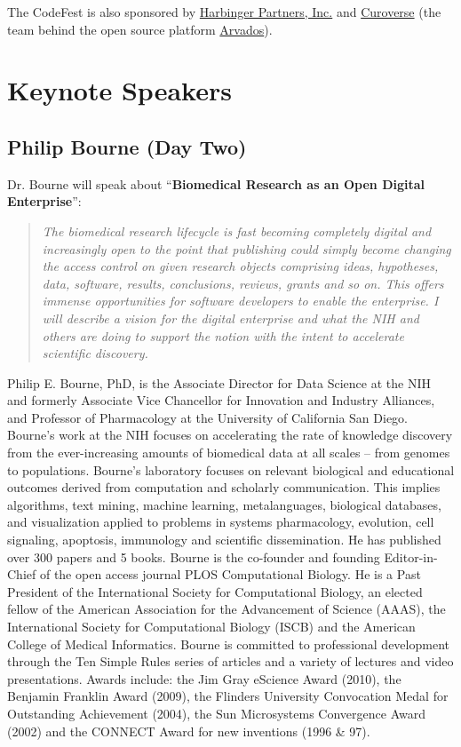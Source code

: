 \documentclass[12pt,oneside]{article}
\newcommand{\session}[3]{\clearpage\lhead{BOSC 2014 -- \textit{#1}\\#2\\#3}\newpage}
\begin{document}
\noindent
The CodeFest is also sponsored by \href{http://harbinger-partners.com/}{Harbinger Partners, Inc.}
and \href{https://curoverse.com/}{Curoverse} (the team behind the open source platform
\href{http://arvados.org/}{Arvados}).

\session{Keynote Speakers}{Days One \& Two, 9 \& 10 July 2014}{}
\section*{Keynote Speakers}

\subsection*{Philip Bourne (Day Two)}
\noindent
Dr. Bourne will speak about ``\textbf{Biomedical Research as an Open Digital Enterprise}'':
\begin{quote}
\small
\textit{The biomedical research lifecycle is fast becoming completely digital
and increasingly open to the point that publishing could simply become changing
the access control on given research objects comprising ideas, hypotheses, data,
software, results, conclusions, reviews, grants and so on. This offers immense
opportunities for software developers to enable the enterprise. I will describe
a vision for the digital enterprise and what the NIH and others are doing to
support the notion with the intent to accelerate scientific discovery.}
\end{quote}
Philip E. Bourne, PhD, is the Associate Director for Data Science at the NIH
and formerly Associate Vice Chancellor for Innovation and Industry Alliances,
and Professor of Pharmacology at the University of California San Diego.
Bourne's work at the NIH focuses on accelerating the rate of knowledge
discovery from the ever-increasing amounts of biomedical data at all scales --
from genomes to populations.
Bourne's laboratory focuses on relevant biological and educational outcomes
derived from computation and scholarly communication. This implies algorithms,
text mining, machine learning, metalanguages, biological databases, and
visualization applied to problems in systems pharmacology, evolution, cell
signaling, apoptosis, immunology and scientific dissemination. He has published
over 300 papers and 5 books. Bourne is the co-founder and founding Editor-in-Chief
of the open access journal PLOS Computational Biology. He is a Past President of
the International Society for Computational Biology, an elected fellow of the
American Association for the Advancement of Science (AAAS), the International
Society for Computational Biology (ISCB) and the American College of Medical
Informatics.
Bourne is committed to professional development through the Ten Simple Rules
series of articles and a variety of lectures and video presentations. Awards
include: the Jim Gray eScience Award (2010), the Benjamin Franklin Award (2009),
the Flinders University Convocation Medal for Outstanding Achievement (2004),
the Sun Microsystems Convergence Award (2002) and the CONNECT Award for new
inventions (1996 \& 97).
\end{document}
